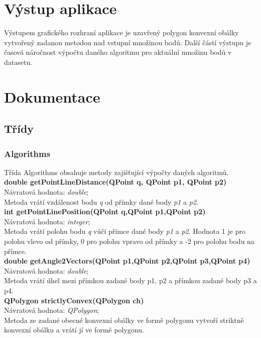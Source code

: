 \documentclass[a4paper, 12pt]{article}
\begin{document}
\section{Výstup aplikace}
Výstupem grafického rozhraní aplikace je uzavřený polygon konvexní obálky vytvořený zadanou metodou nad vstupní množinou bodů. Další částí výstupu je časová náročnost výpočtu daného algoritmu pro aktuální množinu bodů v datasetu. 

\section{Dokumentace}
\subsection{Třídy}
\subsubsection{Algorithms}
Třída Algorithms obsahuje metody zajišťující výpočty daných algoritmů.
\\

\textbf{double getPointLineDistance(QPoint q, QPoint p1, QPoint p2)}\\
Návratová hodnota: \textit{double};\\
Metoda vrátí vzdálenost bodu \textit{q} od přímky dané body\textit{ p1} a \textit{p2}.
\\

\textbf{int getPointLinePosition(QPoint q,QPoint p1,QPoint p2)}\\
Návratová hodnota: \textit{integer};\\
Metoda vrátí polohu bodu \textit{q} vůči přímce dané body\textit{ p1} a \textit{p2}. Hodnota 1 je pro polohu vlevo od přímky, 0 pro polohu vpravo od přímky a -2 pro polohu bodu na přímce.
\\

\textbf{double getAngle2Vectors(QPoint p1,QPoint p2,QPoint p3,QPoint p4)}\\
Návratová hodnota: \textit{double};\\
Metoda vrátí úhel mezi přímkou zadané body p1, p2  a přímkou zadané body p3 a p4.
\\

\textbf{QPolygon strictlyConvex(QPolygon ch)}\\
Návratová hodnota: \textit{QPolygon};\\
Metoda ze zadané obecné konvexní obálky ve formě polygonu vytvoří striktně konvexní obálku a vrátí jí ve formě polygonu.
\\
\end{document}

